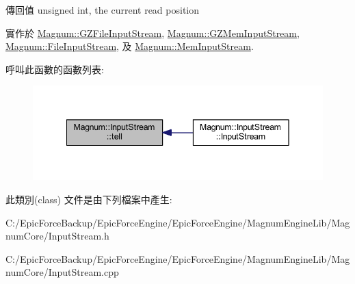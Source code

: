 \begin{DoxyReturn}{傳回值}
unsigned int, the current read position 
\end{DoxyReturn}


實作於 \hyperlink{class_magnum_1_1_g_z_file_input_stream_af46fb848ff587063203fb4f7fc860cc7}{Magnum\+::\+G\+Z\+File\+Input\+Stream}, \hyperlink{class_magnum_1_1_g_z_mem_input_stream_abad8034612efd18ba47bb45231e42cc1}{Magnum\+::\+G\+Z\+Mem\+Input\+Stream}, \hyperlink{class_magnum_1_1_file_input_stream_a0d2d5c30a1bbaa3a9f4209fae1c953d8}{Magnum\+::\+File\+Input\+Stream}, 及 \hyperlink{class_magnum_1_1_mem_input_stream_a533bcf2b8e5b63c080656824fae97aa9}{Magnum\+::\+Mem\+Input\+Stream}.



呼叫此函數的函數列表\+:\nopagebreak
\begin{figure}[H]
\begin{center}
\leavevmode
\includegraphics[width=342pt]{class_magnum_1_1_input_stream_a244ca3d979b3e9fdef2721780db89adc_icgraph}
\end{center}
\end{figure}




此類別(class) 文件是由下列檔案中產生\+:\begin{DoxyCompactItemize}
\item 
C\+:/\+Epic\+Force\+Backup/\+Epic\+Force\+Engine/\+Epic\+Force\+Engine/\+Magnum\+Engine\+Lib/\+Magnum\+Core/Input\+Stream.\+h\item 
C\+:/\+Epic\+Force\+Backup/\+Epic\+Force\+Engine/\+Epic\+Force\+Engine/\+Magnum\+Engine\+Lib/\+Magnum\+Core/Input\+Stream.\+cpp\end{DoxyCompactItemize}
